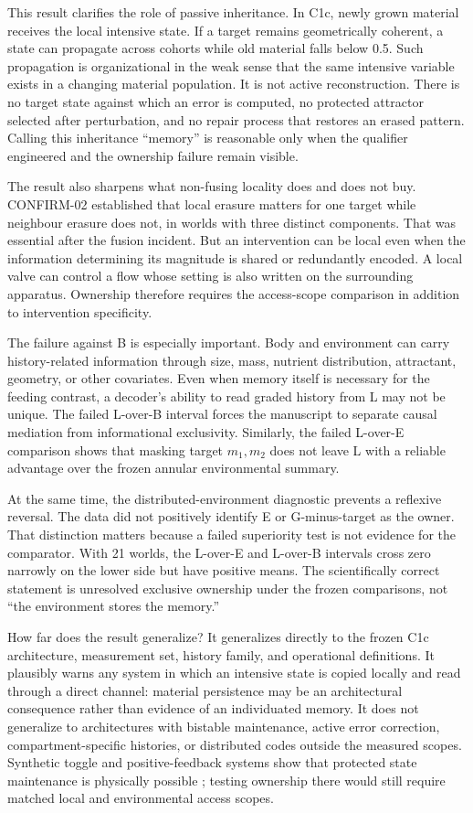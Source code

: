 \documentclass[11pt]{article}
\begin{document}
This result clarifies the role of passive inheritance. In C1c, newly grown material receives the local intensive state. If a target remains geometrically coherent, a state can propagate across cohorts while old material falls below 0.5. Such propagation is organizational in the weak sense that the same intensive variable exists in a changing material population. It is not active reconstruction. There is no target state against which an error is computed, no protected attractor selected after perturbation, and no repair process that restores an erased pattern. Calling this inheritance ``memory'' is reasonable only when the qualifier engineered and the ownership failure remain visible.

The result also sharpens what non-fusing locality does and does not buy. CONFIRM-02 established that local erasure matters for one target while neighbour erasure does not, in worlds with three distinct components. That was essential after the fusion incident. But an intervention can be local even when the information determining its magnitude is shared or redundantly encoded. A local valve can control a flow whose setting is also written on the surrounding apparatus. Ownership therefore requires the access-scope comparison in addition to intervention specificity.

The failure against B is especially important. Body and environment can carry history-related information through size, mass, nutrient distribution, attractant, geometry, or other covariates. Even when memory itself is necessary for the feeding contrast, a decoder's ability to read graded history from L may not be unique. The failed L-over-B interval forces the manuscript to separate causal mediation from informational exclusivity. Similarly, the failed L-over-E comparison shows that masking target $m_1,m_2$ does not leave L with a reliable advantage over the frozen annular environmental summary.

At the same time, the distributed-environment diagnostic prevents a reflexive reversal. The data did not positively identify E or G-minus-target as the owner. That distinction matters because a failed superiority test is not evidence for the comparator. With 21 worlds, the L-over-E and L-over-B intervals cross zero narrowly on the lower side but have positive means. The scientifically correct statement is unresolved exclusive ownership under the frozen comparisons, not ``the environment stores the memory.''

How far does the result generalize? It generalizes directly to the frozen C1c architecture, measurement set, history family, and operational definitions. It plausibly warns any system in which an intensive state is copied locally and read through a direct channel: material persistence may be an architectural consequence rather than evidence of an individuated memory. It does not generalize to architectures with bistable maintenance, active error correction, compartment-specific histories, or distributed codes outside the measured scopes. Synthetic toggle and positive-feedback systems show that protected state maintenance is physically possible \citep{gardner2000,xiong2003}; testing ownership there would still require matched local and environmental access scopes.
\end{document}
